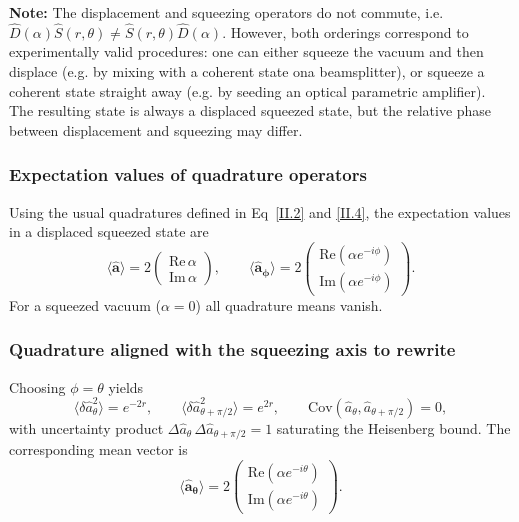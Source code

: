 \noindent \textbf{Note:}  The displacement and squeezing operators do not commute, i.e. $\hat{D}(\alpha)\hat{S}(r, \theta) \neq \hat{S}(r, \theta)\hat{D}(\alpha)$. However, both orderings correspond to experimentally valid procedures: one can either squeeze the vacuum and then displace (e.g. by mixing with a coherent state ona beamsplitter), or squeeze a coherent state straight away (e.g. by seeding an optical parametric amplifier). The resulting state is always a displaced squeezed state, but the relative phase between displacement and squeezing may differ.
\subsubsection*{Expectation values of quadrature operators}

Using the usual quadratures defined in Eq~\eqref{II.2} and \eqref{II.4}, the expectation values in a displaced squeezed state are
\begin{equation}
\langle \mathbf{\hat{a}} \rangle
= 2
\begin{pmatrix}
\mathrm{Re}\,\alpha \\[2pt]
\mathrm{Im}\,\alpha
\end{pmatrix}, 
\qquad
\langle \mathbf{\hat{a}_\phi} \rangle
= 2
\begin{pmatrix}
\mathrm{Re}\!\left(\alpha e^{-i\phi}\right) \\[2pt]
\mathrm{Im}\!\left(\alpha e^{-i\phi}\right)
\end{pmatrix}.
\label{II.xx3}
\end{equation}
For a squeezed vacuum ($\alpha=0$) all quadrature means vanish.

\subsubsection*{Quadrature aligned with the squeezing axis \color{red} to rewrite \color{black}}

Choosing $\phi = \theta$ yields
\begin{equation}
\langle \delta \hat a_\theta^2  \rangle = e^{-2r}, \qquad
\langle \delta \hat a_{\theta+\pi/2}^2 \rangle = e^{2r}, \qquad
\mathrm{Cov}(\hat a_\theta, \hat a_{\theta+\pi/2}) = 0,
\end{equation}
with uncertainty product $\Delta \hat a_\theta\, \Delta \hat a_{\theta+\pi/2} = 1$ saturating the Heisenberg bound.
The corresponding mean vector is
\begin{equation}
\langle \mathbf{\hat{a}_\theta} \rangle
= 2
\begin{pmatrix}
\mathrm{Re}(\alpha e^{-i\theta}) \\[2pt]
\mathrm{Im}(\alpha e^{-i\theta})
\end{pmatrix}.
\label{II.xx7}
\end{equation}

